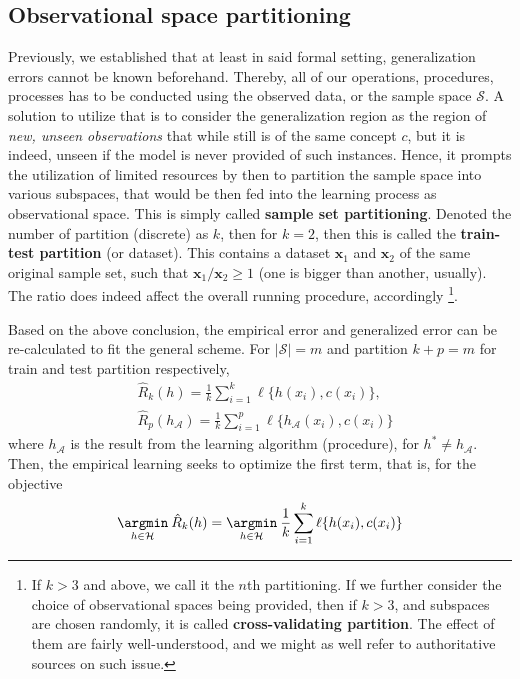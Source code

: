 \documentclass[
  journal=largetwo,
  year=2025,
  volume=37,
]{cup-journal}
\begin{document}
\subsection{Observational space partitioning}

Previously, we established that at least in said formal setting, generalization errors cannot be known beforehand. Thereby, all of our operations, procedures, processes has to be conducted using the observed data, or the sample space $\mathcal{S}$. A solution to utilize that is to consider the generalization region as the region of \textit{new, unseen observations} that while still is of the same concept $c$, but it is indeed, unseen if the model is never provided of such instances. Hence, it prompts the utilization of limited resources by then to partition the sample space into various subspaces, that would be then fed into the learning process as observational space. This is simply called \textbf{sample set partitioning}. Denoted the number of partition (discrete) as $k$, then for $k=2$, then this is called the \textbf{train-test partition} (or dataset). This contains a dataset $\mathbf{x}_{1}$ and $\mathbf{x}_{2}$ of the same original sample set, such that $\mathbf{x}_{1}/\mathbf{x}_{2}\geq 1$ (one is bigger than another, usually). The ratio does indeed affect the overall running procedure, accordingly \footnote{If $k>3$ and above, we call it the $n$th partitioning. If we further consider the choice of observational spaces being provided, then if $k>3$, and subspaces are chosen randomly, it is called \textbf{cross-validating partition}. The effect of them are fairly well-understood, and we might as well refer to authoritative sources on such issue.}.



Based on the above conclusion, the empirical error and generalized error can be re-calculated to fit the general scheme. For $\lvert \mathcal{S}\rvert = m$ and partition $k+p=m$ for train and test partition respectively, 
\begin{align}
    &\hat{R}_{k}(h) = \frac{1}{k} \sum^{k}_{i=1} \ell\{h(x_{i}),c(x_{i})\},\\
    &\hat{R}_{p}(h_{\mathcal{A}}) = \frac{1}{k} \sum^{p}_{i=1} \ell\{h_{\mathcal{A}}(x_{i}),c(x_{i})\}
\end{align}
where $h_{\mathcal{A}}$ is the result from the learning algorithm (procedure), for $h^{*}\neq h_{\mathcal{A}}$. Then, the empirical learning seeks to optimize the first term, that is, for the objective 
\begin{equation}
    \underset{h\in \mathcal{H}}{\argmin}\: \hat{R}_{k}(h) = \underset{h\in \mathcal{H}}{\argmin}\:\frac{1}{k} \sum^{k}_{i=1} \ell\{h(x_{i}),c(x_{i})\}
\end{equation}
\end{document}
